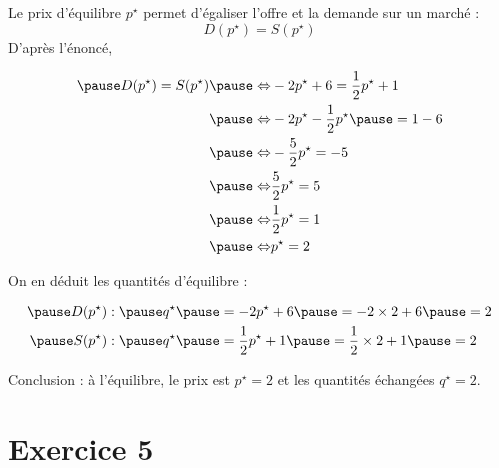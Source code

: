\documentclass[9pt,professionalfonts,handout,hyperref]{beamer}
\begin{document}
\begin{frame}
	
\pause Le prix d'équilibre $p^{\star}$ permet d'égaliser l'offre et la demande sur un marché : $$D(p^{\star}) = S(p^{\star})$$
\pause D'après l'énoncé, 
	
\[\begin{aligned}
\pause D(p^{\star}) = S(p^{\star}) 
\pause \Leftrightarrow& -2 p^{\star}  + 6 = \frac{1}{2} p^{\star}  + 1\\
\pause \Leftrightarrow& -2 p^{\star} -\frac{1}{2} p^{\star} \pause  = 1 - 6\\
\pause \Leftrightarrow& -\frac{5}{2} p^{\star}  = -5\\
\pause \Leftrightarrow& \frac{5}{2} p^{\star}  = 5\\
\pause \Leftrightarrow& \frac{1}{2} p^{\star}  = 1\\
\pause \Leftrightarrow& p^{\star}  = 2\\
\end{aligned}\]

\pause On en déduit les quantités d'équilibre : 

\[\begin{aligned}
\pause D(p^\star): \pause q^\star \pause &= -2 p^\star  + 6 \pause = -2\times 2 +6 \pause = 2\\
\pause S(p^\star): \pause q^\star \pause &= \frac{1}{2} p^\star  + 1 \pause = \frac{1}{2}\times 2  + 1 \pause = 2
\end{aligned}\]

\pause Conclusion : à l'équilibre, le prix est $p^\star = 2$ et les quantités échangées $q^\star = 2$.
	
\end{frame}



%
%
\section{Exercice 5}
\end{document}
